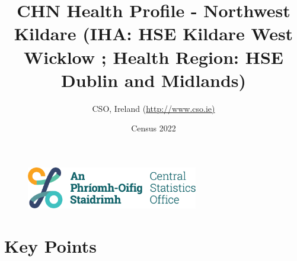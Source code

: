 \documentclass{article}
\title{CHN Health Profile - Northwest Kildare (IHA: HSE Kildare West Wicklow ;  Health Region: HSE Dublin and Midlands) }
\date{Census 2022}
\author{CSO, Ireland  (\url{http://www.cso.ie)}}
\begin{document}


\begin{figure}
	\centering
\includegraphics[width =75mm]{../figures/CSO_Logo.png}
\end{figure}

				 
		   
						  
														  
																																													
												 
			 
\maketitle
					
													   
				 
						 
																																																																											   
				 
				  
  \pagebreak
    	    \tableofcontents

\pagebreak


\section{Key Points}
\end{document}
